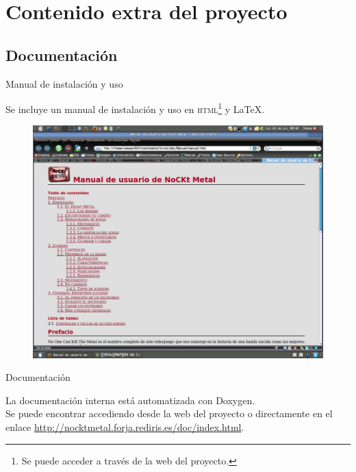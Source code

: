 \documentclass[9pt,xcolor=svgnames]{beamer}
\begin{document}
 \section{Contenido extra del proyecto}

  \subsection{Documentación}

   \begin{frame}{Manual de instalación y uso}
    \transdissolve
    
    Se incluye un manual de instalación y uso en
    \textsc{html}\footnote{Se puede acceder a través de la web del
    proyecto.} y \LaTeX.
    

    \begin{figure}[t]
     \centering
     \includegraphics[scale=0.18]{./Imagenes/manual.pdf}
    \end{figure}
   \end{frame}


   \begin{frame}{Documentación}
    \transdissolve
    
    La documentación interna está automatizada con Doxygen.\\

    Se puede encontrar accediendo desde la web del proyecto o
    directamente en el enlace
    \url{http://nocktmetal.forja.rediris.es/doc/index.html}.

   \end{frame}
\end{document}
